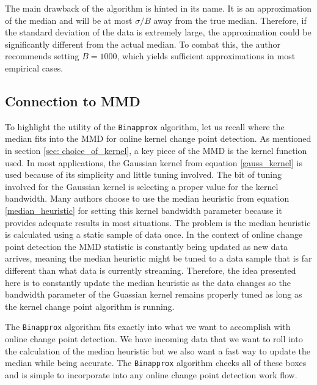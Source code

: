 The main drawback of the algorithm is hinted in its name. It is an approximation of the median and will be at most $\sigma / B$ away from the true median. Therefore, if the standard deviation of the data is extremely large,
the approximation could be significantly different from the actual median. To combat this, the author recommends setting $B=1000$, which yields sufficient approximations in most empirical cases. 

\subsection{Connection to MMD}
To highlight the utility of the \texttt{Binapprox} algorithm, let us recall where the median fits into the MMD for online kernel change point detection. As mentioned in section \ref{sec: choice_of_kernel}, a key piece of the MMD is the kernel function used. In most applications, the Gaussian kernel from equation \ref{gauss_kernel} is used because of its simplicity and little tuning involved. The bit of tuning involved for the Gaussian kernel is selecting a proper value for the kernel bandwidth. Many authors choose to use the median heuristic from equation \ref{median_heuristic} for setting this kernel bandwidth parameter because it provides adequate results in most situations. The problem is the median heuristic is calculated using a static sample of data once. In the context of online change point detection the MMD statistic is constantly being updated as new data arrives, meaning the median heuristic might be tuned to a data sample that is far different than what data is currently streaming. Therefore, the idea presented here is to constantly update the median heuristic as the data changes so the bandwidth parameter of the Guassian kernel remains properly tuned as long as the kernel change point algorithm is running. 

The  \texttt{Binapprox} algorithm fits exactly into what we want to accomplish with online change point detection. We have incoming data that we want to roll into the calculation of the median heuristic but we also want a fast way to update the median while being accurate. The \texttt{Binapprox} algorithm checks all of these boxes and is simple to incorporate into any online change point detection work flow.


